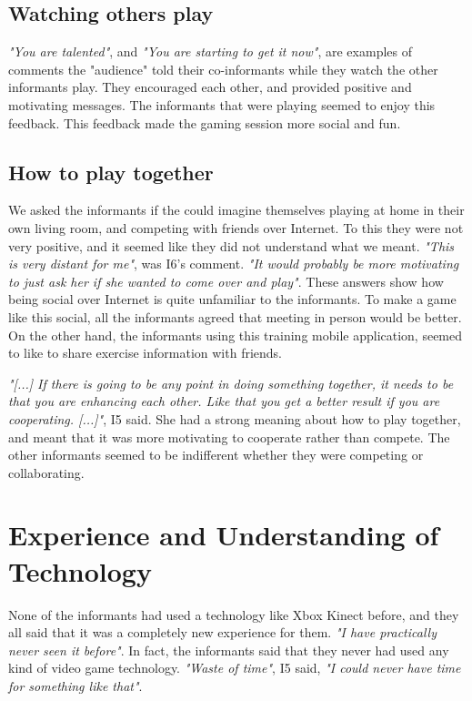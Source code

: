 \subsection{Watching others play}
\emph{"You are talented"}, and \emph{"You are starting to get it now"}, are examples of comments the "audience" told their co-informants while they watch the other informants play. They encouraged each other, and provided positive and motivating messages. The informants that were playing seemed to enjoy this feedback. This feedback made the gaming session more social and fun.  

\subsection{How to play together}
We asked the informants if the could imagine themselves playing at home in their own living room, and competing with friends over Internet. To this they were not very positive, and it seemed like they did not understand what we meant. \emph{"This is very distant for me"}, was I6's comment. \emph{"It would probably be more motivating to just ask her if she wanted to come over and play"}. These answers show how being social over Internet is quite unfamiliar to the informants. To make a game like this social, all the informants agreed that meeting in person would be better. On the other hand, the informants using this training mobile application, seemed to like to share exercise information with friends.

\emph{"[...] If there is going to be any point in doing something together, it needs to be that you are enhancing each other. Like that you get a better result if you are cooperating. [...]"}, I5 said. She had a strong meaning about how to play together, and meant that it was more motivating to cooperate rather than compete. The other informants seemed to be indifferent whether they were competing or collaborating.

\section{Experience and Understanding of Technology}
None of the informants had used a technology like Xbox Kinect before, and they all said that it was a completely new experience for them. \emph{"I have practically never seen it before"}. In fact, the informants said that they never had used any kind of video game technology. \emph{"Waste of time"}, I5 said, \emph{"I could never have time for something like that"}.  


